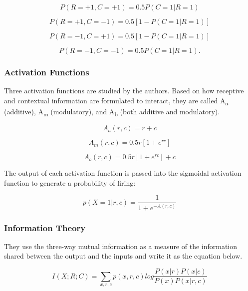 \begin{equation}
P(R = +1, C = +1) = 0.5P(C = 1 | R = 1)
\end{equation}

\begin{equation}
P(R =+1, C = -1) = 0.5[1 - P(C = 1 | R = 1)]
\end{equation}

\begin{equation}
P(R = -1, C = +1) = 0.5[1 - P(C = 1 | R = 1)]
\end{equation}

\begin{equation}
P(R = -1, C = -1) = 0.5P(C = 1 | R = 1).
\end{equation}


\subsubsection{Activation Functions}
Three activation functions are studied by the authors. Based on how receptive and contextual information are formulated to interact, they are called A\textsubscript{a} (additive), A\textsubscript{m} (modulatory), and A\textsubscript{b} (both additive and modulatory). 

\begin{equation}
A_a(r,c) = r + c 
\end{equation}

\begin{equation}
A_m(r,c) = 0.5r[1 + e^{rc}] 
\end{equation}

\begin{equation}
A_b(r,c) = 0.5r[1 + e^{rc}] + c  
\end{equation}


The output of each activation function is passed into the sigmoidal activation function to generate a probability of firing:

\begin{equation}
p(X=1 | r,c) = \frac{1}{1 + e^{-A(r,c)}} 
\end{equation}


\subsubsection{Information Theory}
They use the three-way mutual information as a measure of the information shared between the output and the inputs and write it as the equation below.

\begin{equation}
I(X;R;C) = \sum_{x,r,c}p(x,r,c)log\frac{P(x|r)P(x|c)}{P(x)P(x|r,c)}
\end{equation}

